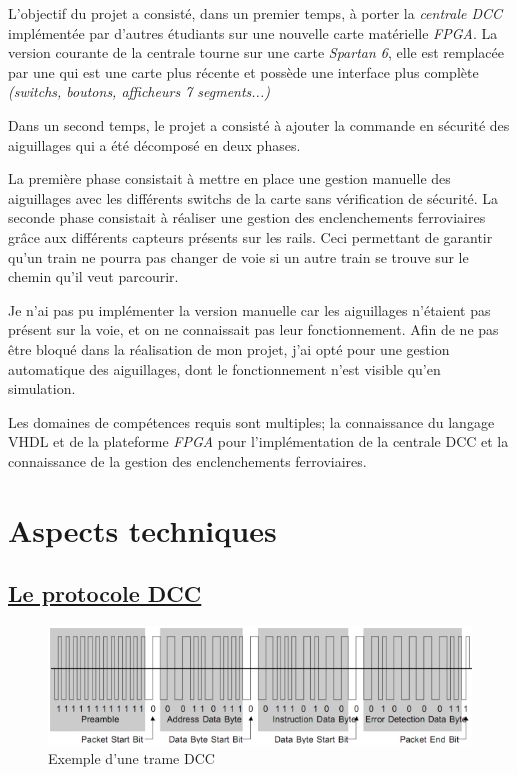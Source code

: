 L'objectif du projet a consisté, dans un premier temps, à porter la
\emph{centrale DCC} implément\'ee par d'autres \'etudiants sur une nouvelle
carte mat\'erielle \emph{FPGA}. La version courante de la centrale tourne sur
une carte \emph{Spartan 6}, elle est remplac\'ee par une \crt qui est
une carte plus r\'ecente et possède une interface plus complète
\emph{(switchs, boutons, afficheurs 7 segments...)}

Dans un second temps, le projet a consisté à ajouter la commande en
sécurité des aiguillages qui a été décomposé en deux phases.

La première phase consistait à mettre en place une gestion manuelle des aiguillages avec
les diff\'erents switchs de la carte sans v\'erification de
s\'ecurit\'e.
La seconde phase consistait à réaliser une gestion des
enclenchements ferroviaires grâce aux différents capteurs pr\'esents sur
les rails. Ceci permettant de garantir qu'un train ne pourra pas
changer de voie si un autre train se trouve sur le chemin
qu'il veut parcourir. 


Je n'ai pas pu implémenter la version manuelle car les
aiguillages n'étaient pas présent sur la voie, et on ne connaissait pas
leur fonctionnement. Afin de ne pas être bloqué dans la réalisation de mon projet,
j'ai opté pour une gestion automatique des
aiguillages, dont le fonctionnement n'est visible qu'en simulation.


Les domaines de comp\'etences requis sont multiples; la connaissance
du langage VHDL et de la plateforme \emph{FPGA} pour l'impl\'ementation
de la centrale DCC et la connaissance de la gestion des enclenchements
ferroviaires.


\newpage
\section{Aspects techniques}
\label{sec:asp_tech}

\subsection{\underline{Le protocole DCC}}
\label{sec:dcc}


\begin{figure}[h]
\centering
\includegraphics[scale=0.75]{trame.png}
\caption{Exemple d'une trame DCC}
\label{fig1}
\end{figure}

